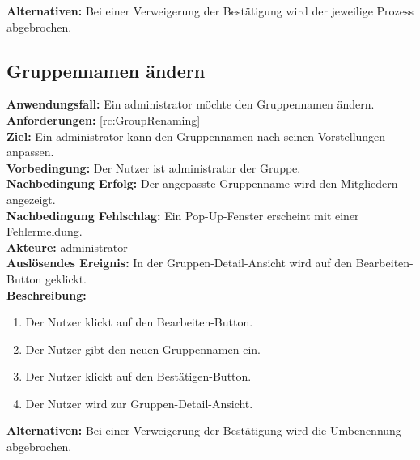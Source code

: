 \documentclass[parskip=full]{scrartcl}
\begin{document}
\textbf{Alternativen:} Bei einer Verweigerung der Bestätigung wird der jeweilige Prozess abgebrochen.
\newpage


\subsection{Gruppennamen ändern}
\textbf{Anwendungsfall:} Ein \gls{administrator} möchte den Gruppennamen ändern.\\
\textbf{Anforderungen:} \ref{rc:GroupRenaming}\\
\textbf{Ziel:} Ein \gls{administrator} kann den Gruppennamen nach seinen Vorstellungen anpassen.\\
\textbf{Vorbedingung:} Der Nutzer ist \gls{administrator} der Gruppe.\\
\textbf{Nachbedingung Erfolg:} Der angepasste Gruppenname wird den Mitgliedern angezeigt.\\
\textbf{Nachbedingung Fehlschlag:} Ein Pop-Up-Fenster erscheint mit einer Fehlermeldung.\\
\textbf{Akteure:} \gls{administrator}\\
\textbf{Auslösendes Ereignis:} In der Gruppen-Detail-Ansicht wird auf den Bearbeiten-Button geklickt.\\
\textbf{Beschreibung:}
\begin{enumerate}
    \item Der Nutzer klickt auf den Bearbeiten-Button.
    \item Der Nutzer gibt den neuen Gruppennamen ein.
    \item Der Nutzer klickt auf den Bestätigen-Button.
    \item Der Nutzer wird zur Gruppen-Detail-Ansicht.
\end{enumerate}
\textbf{Alternativen:} Bei einer Verweigerung der Bestätigung wird die Umbenennung abgebrochen.
\newpage
\end{document}
